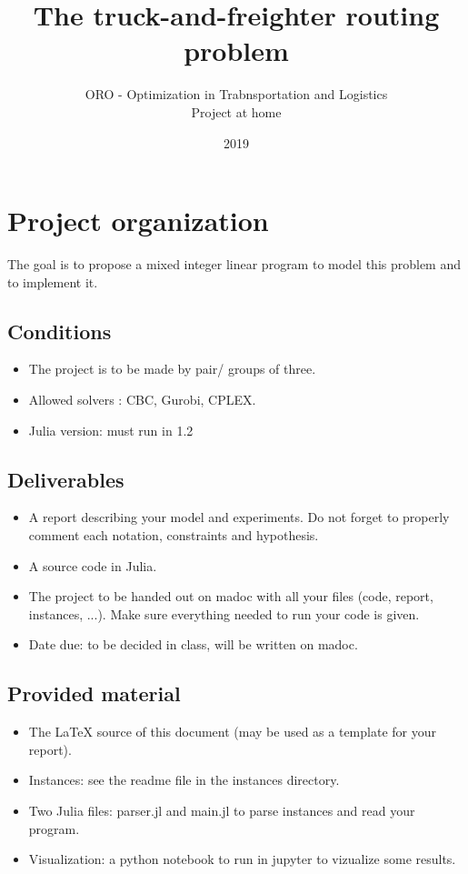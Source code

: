 \documentclass[dvipsnames,authoryear,11pt]{article}
\title{The truck-and-freighter routing problem}
\author{ORO - Optimization in Trabnsportation and Logistics \\
	Project at home }
\date{2019}
\begin{document}
	
	\maketitle

		

\section{Project organization}

The goal is to propose a mixed integer linear program to model this problem and to implement it.

\subsection*{Conditions}

\begin{itemize}
	\item The project is to be made by pair/ groups of three. 
	\item Allowed solvers : CBC, Gurobi, CPLEX.
	\item Julia version: must run in 1.2
\end{itemize}


\subsection*{Deliverables}

\begin{itemize}
	\item A report describing your model and experiments. Do not forget to properly comment each notation, constraints and hypothesis.
	\item A source code in Julia.
	\item The project to be handed out on madoc with all your files (code, report, instances, ...). Make sure everything needed to run your code is given.
	\item Date due: to be decided in class, will be written on madoc.
\end{itemize}

\subsection*{Provided material}

\begin{itemize}
	\item The LaTeX source of this document (may be used as a template for your report).
	\item Instances: see the readme file in the instances directory.
	\item Two Julia files: parser.jl and main.jl to parse instances and read your program.
	\item Visualization: a python notebook to run in jupyter to vizualize some results.
\end{itemize}
\end{document}

